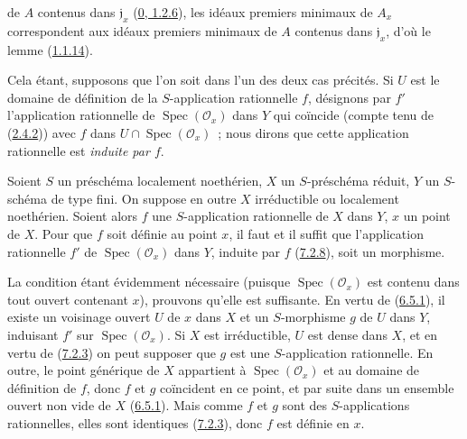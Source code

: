 de $A$ contenus dans $\mathfrak{j}_x$
(\hyperref[0.1.2.6-fr]{0, 1.2.6}), les idéaux premiers minimaux de $A_x$
correspondent aux idéaux premiers minimaux de $A$ contenus dans
$\mathfrak{j}_x$, d'où le lemme (\hyperref[I.1.1.14-fr]{1.1.14}).

Cela étant, supposons que l'on soit dans l'un des deux cas précités. Si $U$
est le domaine de définition de la $S$-application rationnelle $f$, désignons
par $f'$ l'application rationnelle de $\operatorname{Spec}(\mathscr{O}_x)$
dans $Y$ qui coïncide (compte tenu de (\hyperref[I.2.4.2-fr]{2.4.2})) avec
$f$ dans $U\cap\operatorname{Spec}(\mathscr{O}_x)$~; nous dirons que cette
application rationnelle est \emph{induite par $f$}.

\begin{proposition}[7.2.9]
\label{I.7.2.9-fr}
Soient $S$ un préschéma localement noethérien, $X$ un $S$-préschéma réduit,
$Y$ un $S$-schéma de type fini. On suppose en outre $X$ irréductible ou
localement noethérien. Soient alors $f$ une $S$-application rationnelle de
$X$ dans $Y$, $x$ un point de $X$. Pour que $f$ soit définie au point $x$,
il faut et il suffit que l'application rationnelle $f'$ de
$\operatorname{Spec}(\mathscr{O}_x)$ dans $Y$, induite par $f$
(\hyperref[I.7.2.8-fr]{7.2.8}), soit un morphisme.
\end{proposition}

La condition étant évidemment nécessaire (puisque
$\operatorname{Spec}(\mathscr{O}_x)$ est contenu dans tout ouvert contenant
$x$), prouvons qu'elle est suffisante. En vertu de
(\hyperref[I.6.5.1-fr]{6.5.1}), il existe un voisinage ouvert $U$ de $x$ dans
$X$ et un $S$-morphisme $g$ de $U$ dans $Y$, induisant $f'$ sur
$\operatorname{Spec}(\mathscr{O}_x)$. Si $X$ est irréductible, $U$ est dense
dans $X$, et en vertu de (\hyperref[I.7.2.3-fr]{7.2.3}) on peut supposer que
$g$ est une $S$-application rationnelle. En outre, le point générique de $X$
appartient à $\operatorname{Spec}(\mathscr{O}_x)$ et au domaine de définition
de $f$, donc $f$ et $g$ coïncident en ce point, et par suite dans un ensemble
ouvert non vide de $X$ (\hyperref[I.6.5.1-fr]{6.5.1}). Mais comme $f$ et $g$
sont des $S$-applications rationnelles, elles sont identiques
(\hyperref[I.7.2.3-fr]{7.2.3}), donc $f$ est définie en $x$.

